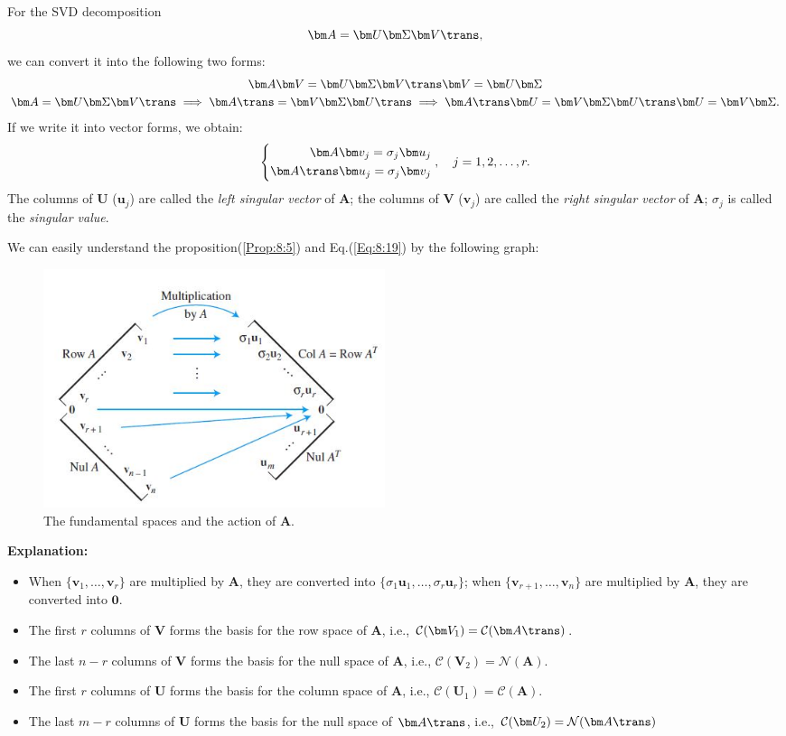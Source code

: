 For the SVD decomposition
\[
\bm A=\bm U\bm\Sigma\bm V\trans,
\]
we can convert it into the following two forms:
\begin{gather*}
\bm A\bm V=\bm U\bm\Sigma\bm V\trans\bm V=\bm U\bm\Sigma\\
\bm A=\bm U\bm\Sigma\bm V\trans\implies
\bm A\trans=\bm V\bm\Sigma\bm U\trans\implies
\bm A\trans\bm U=\bm V\bm\Sigma\bm U\trans\bm U=\bm V\bm\Sigma.
\end{gather*}
If we write it into vector forms, we obtain:
\begin{equation}
\left\{
\begin{aligned}
\bm A\bm v_j=\sigma_j\bm u_j\\
\bm A\trans\bm u_j=\sigma_j\bm v_j
\end{aligned}
\right.,\quad j=1,2,\dots,r.\label{Eq:8:19}
\end{equation}
The columns of $\bm U$ ($\bm u_j$) are called the \emph{left singular vector} of $\bm A$; the columns of $\bm V$ ($\bm v_j$) are called the \emph{right singular vector} of $\bm A$; $\sigma_j$ is called the \emph{singular value}.

We can easily understand the proposition(\ref{Prop:8:5}) and Eq.(\ref{Eq:8:19}) by the following graph:
\begin{figure}[H]
\centering
\includegraphics[width=10cm]{week7/fundamental}
\caption{The fundamental spaces and the action of $\bm A$.}
\end{figure}
\textbf{Explanation:}
\begin{itemize}
\item
When $\{\bm v_1,\dots,\bm v_r\}$ are multiplied by $\bm A$, they are converted into $\{\sigma_1\bm u_1,\dots,\sigma_r\bm u_r\}$; when $\{\bm v_{r+1},\dots,\bm v_{n}\}$ are multiplied by $\bm A$, they are converted into $\bm0$.
\item
The first $r$ columns of $\bm V$ forms the basis for the row space of $\bm A$, i.e., $\mathcal{C}(\bm V_1)=\mathcal{C}(\bm A\trans)$.
\item
The last $n-r$ columns of $\bm V$ forms the basis for the null space of $\bm A$, i.e., $\mathcal{C}(\bm V_2)=\mathcal{N}(\bm A)$.
\item
The first $r$ columns of $\bm U$ forms the basis for the column space of $\bm A$, i.e., $\mathcal{C}(\bm U_1)=\mathcal{C}(\bm A)$.
\item
The last $m-r$ columns of $\bm U$ forms the basis for the null space of $\bm A\trans$, i.e., $\mathcal{C}(\bm U_2)=\mathcal{N}(\bm A\trans)$
\end{itemize}

